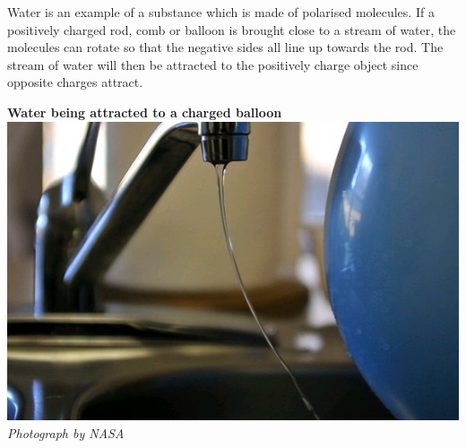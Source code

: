 \begin{minipage}{.5\textwidth}
        
        \label{m38780*id201929}Water is an example of a substance which is made of polarised molecules.
If a positively charged rod, comb or balloon is brought close to a stream of water, the molecules can rotate
so that the negative sides all line up towards the rod.
The stream of water will then be attracted to the positively charge object since opposite charges attract.
    \end{minipage}
\begin{minipage}{.5\textwidth}
\begin{center}
 \textbf{Water being attracted to a charged balloon}\\

 \includegraphics[width=.8\textwidth]{photos/waterandballoon.jpg}\\
\textsl{Photograph by NASA}
\end{center}
\end{minipage}
            \nopagebreak
